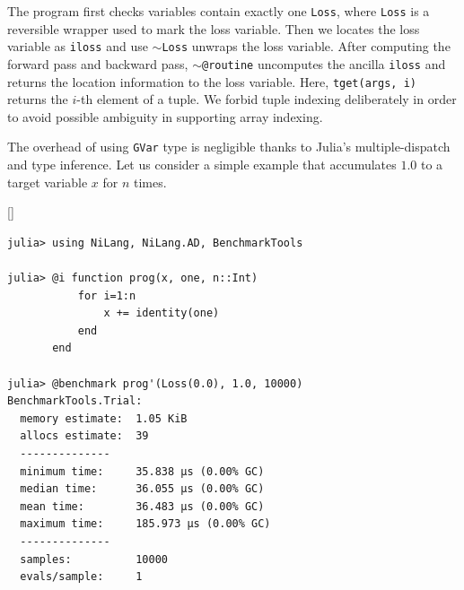 \documentclass[aps,twocolumn,longbibliography,english,superscriptaddress]{revtex4-1}
\newcommand{\<}{\langle}
\renewcommand{\>}{\rangle}
\newcommand{\blue}[1]{[{\bf  \color{blue}{JG: #1}}]}
\theoremstyle{definition}\newtheorem{definition}{\textit{Definition}}
\begin{document}
The program first checks variables contain exactly one \texttt{Loss}, where \texttt{Loss} is a reversible wrapper used to mark the loss variable. 
Then we locates the loss variable as \texttt{iloss} and use \texttt{$\sim$Loss} unwraps the loss variable. After computing the forward pass and backward pass, \texttt{$\sim$@routine} uncomputes the ancilla \texttt{iloss} and returns the location information to the loss variable.
Here, \texttt{tget(args, i)} returns the $i$-th element of a tuple. We forbid tuple indexing deliberately in order to avoid possible ambiguity in supporting array indexing.

The overhead of using \texttt{GVar} type is negligible thanks to Julia's multiple-dispatch and type inference. Let us consider a simple example that accumulates $1.0$ to a target variable $x$ for $n$ times.

\blue{Grammarly here!}

\begin{minipage}{.44\textwidth}
\begin{lstlisting}
julia> using NiLang, NiLang.AD, BenchmarkTools

julia> @i function prog(x, one, n::Int)
           for i=1:n
               x += identity(one)
           end
       end

julia> @benchmark prog'(Loss(0.0), 1.0, 10000)
BenchmarkTools.Trial: 
  memory estimate:  1.05 KiB
  allocs estimate:  39
  --------------
  minimum time:     35.838 μs (0.00% GC)
  median time:      36.055 μs (0.00% GC)
  mean time:        36.483 μs (0.00% GC)
  maximum time:     185.973 μs (0.00% GC)
  --------------
  samples:          10000
  evals/sample:     1
\end{lstlisting}
\end{minipage}
\end{document}

